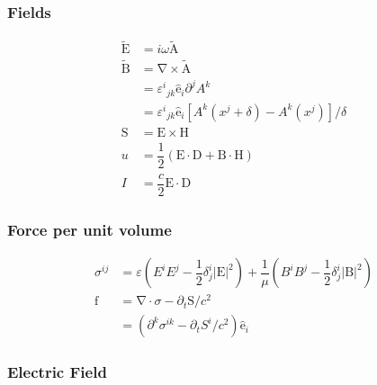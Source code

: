 \documentclass[xcolor=dvipsnames]{beamer}
\renewcommand{\c}{\cdot} %
\newcommand{\f}[2]{\dfrac{#1}{#2}} %
\newcommand{\p}[1]{\left(#1\right)} %
\renewcommand{\sp}[1]{\left[#1\right]} %
\newcommand{\abs}[1]{\left|#1\right|} %
\renewcommand{\epsilon}{\varepsilon} %
\renewcommand{\v}[1]{\boldsymbol{\mathrm{#1}}} %
\newcommand{\uv}[1]{\hat{\boldsymbol{\mathrm{#1}}}} %
\newcommand{\del}{\v\nabla} %
\renewcommand{\d}{\partial} %
\newcommand{\cxv}[1]{\v{\widetilde{#1}}} %
\begin{document}
\begin{frame}
  \frametitle{Fields}
  \begin{align*}
    \cxv E&=i\omega\cxv A \\
    \cxv B&=\del \times\cxv A \\
    &={\varepsilon^i}_{jk}\uv e_i\d^jA^k \\
    &={\varepsilon^i}_{jk}\uv
    e_i\sp{A^k\p{x^j+\delta}-A^k\p{x^j}}/\delta \\
    \v S&=\v E\times\v H \\
    u&=\f12\p{\v E\c\v D+\v B\c\v H} \\
    I&=\f c2\v E\c\v D
  \end{align*}
\end{frame}

\begin{frame}
  \frametitle{Force per unit volume}
  \begin{align*}
    \sigma^{ij}&=\epsilon\p{E^iE^j-\f12\delta^i_j\abs{\v E}^2}
    +\f1\mu\p{B^iB^j-\f12\delta^i_j\abs{\v B}^2} \\
    \v f&=\del\c\sigma-\d_t\v S/c^2 \\
    &=\p{\d^k\sigma^{ik}-\d_tS^i/c^2}\uv e_i
  \end{align*}
\end{frame}

\begin{frame}
  \frametitle{Electric Field}
  \begin{columns}[T,totalwidth=\textwidth]
    \begin{figure}[h]
      \centering {}
    \end{figure}

    \begin{figure}[h]
      \centering \vspace{-.6in} 
    \end{figure}

  \end{columns}
\end{frame}
\end{document}

